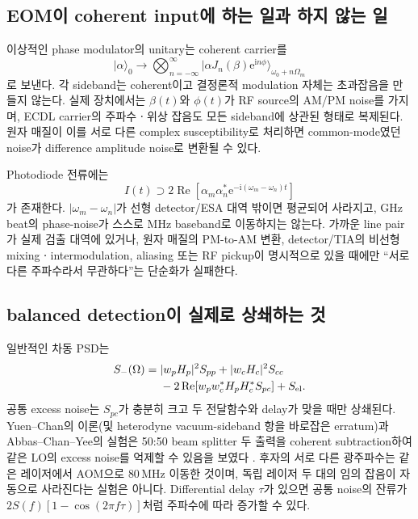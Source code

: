 \documentclass[11pt,a4paper]{article}
\newcommand{\ii}{\mathrm i}
\newcommand{\e}{\mathrm e}
\newcommand{\Rea}{\operatorname{Re}}
\newcommand{\MHz}{\,\mathrm{MHz}}
\newcommand{\ket}[1]{\lvert #1\rangle}
\newcommand{\enquote}[1]{“#1”}
\begin{document}
\subsection{EOM이 coherent input에 하는 일과 하지 않는 일}

이상적인 phase modulator의 unitary는 coherent carrier를
\begin{equation}
\ket{\alpha}_{0}\longrightarrow
\bigotimes_{n=-\infty}^{\infty}
\ket{\alpha J_n(\beta)\e^{\ii n\phi}}_{\omega_0+n\Omega_m}
\end{equation}
로 보낸다. 각 sideband는 coherent이고 결정론적 modulation 자체는 초과잡음을
만들지 않는다. 실제 장치에서는 $\beta(t)$와 $\phi(t)$가 RF source의 AM/PM noise를
가지며, ECDL carrier의 주파수ㆍ위상 잡음도 모든 sideband에 상관된 형태로 복제된다.
원자 매질이 이를 서로 다른 complex susceptibility로 처리하면 common-mode였던
noise가 difference amplitude noise로 변환될 수 있다.

Photodiode 전류에는
\begin{equation}
I(t)\supset 2\Rea\!\left[
\alpha_m\alpha_n^*\e^{-\ii(\omega_m-\omega_n)t}\right]
\label{eq:beat}
\end{equation}
가 존재한다. $|\omega_m-\omega_n|$가 선형 detector/ESA 대역 밖이면 평균되어
사라지고, GHz beat의 phase-noise가 스스로 MHz baseband로 이동하지는 않는다. 가까운
line pair가 실제 검출 대역에 있거나, 원자 매질의 PM-to-AM 변환, detector/TIA의
비선형 mixingㆍintermodulation, aliasing 또는 RF pickup이 명시적으로 있을 때에만
\enquote{서로 다른 주파수라서 무관하다}는 단순화가 실패한다.

\subsection{balanced detection이 실제로 상쇄하는 것}

일반적인 차동 PSD는
\begin{align}
S_-(\Omega)={}&|w_pH_p|^2S_{pp}+|w_cH_c|^2S_{cc}\nonumber\\
&-2\Rea\!\left[w_pw_c^*H_pH_c^*S_{pc}\right]+S_{\rm el}.
\label{eq:balanced-psd}
\end{align}
공통 excess noise는 $S_{pc}$가 충분히 크고 두 전달함수와 delay가 맞을 때만 상쇄된다.
Yuen--Chan의 이론(및 heterodyne vacuum-sideband 항을 바로잡은 erratum)과
Abbas--Chan--Yee의 실험은 50:50 beam splitter 두 출력을
coherent subtraction하여 같은 LO의 excess noise를 억제할 수 있음을 보였다
\cite{YuenChan1983,YuenChan1983Erratum,Abbas1983}. 후자의 서로 다른 광주파수는 같은 레이저에서 AOM으로
$80\MHz$ 이동한 것이며, 독립 레이저 두 대의 임의 잡음이 자동으로 사라진다는
실험은 아니다. Differential delay $\tau$가 있으면 공통 noise의 잔류가
$2S(f)[1-\cos(2\pi f\tau)]$처럼 주파수에 따라 증가할 수 있다\cite{Abbas1983}.
\end{document}
